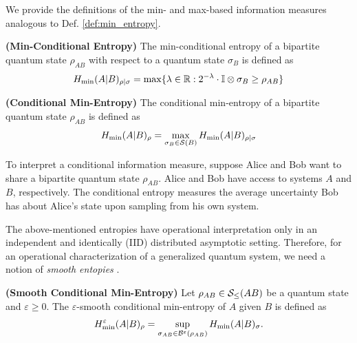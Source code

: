 
We provide the definitions of the min- and max-based information measures analogous to Def. \ref{def:min_entropy}. 


\begin{definition}
\textbf{(Min-Conditional Entropy)} The min-conditional entropy of a bipartite quantum state $\rho_{AB}$ with respect to a quantum state $\sigma_B$ is defined as 
\[H_{\min}(A|B)_{\rho|\sigma} = \max\{\lambda \in \mathbb{R} : 2^{-\lambda}\cdot \mathbb{I} \otimes \sigma_B \geq \rho_{AB}\}\]
\end{definition}

\begin{definition}
\textbf{(Conditional Min-Entropy) }The conditional min-entropy of a bipartite quantum state $\rho_{AB}$ is defined as 
\[H_{\min}(A|B)_{\rho} = \max_{\sigma_B \in \mathcal{S}(B)} H_{\min}(A|B)_{\rho|\sigma}\]
\end{definition}

To interpret a conditional information measure, suppose Alice and Bob want to share a bipartite quantum state $\rho _{AB}$. Alice and Bob have access to systems $A$ and $B$, respectively. The conditional entropy measures the average uncertainty Bob has about Alice's state upon sampling from his own system.
 
The above-mentioned entropies have operational interpretation only in an independent and identically (IID) distributed asymptotic setting. Therefore, for an operational characterization of a generalized quantum system, we need a notion of \textit{smooth entopies} \cite{tomamichel2012framework}. 

 
\begin{definition}\textbf{(Smooth Conditional Min-Entropy)} Let $\rho_{AB} \in \mathcal{S}_{\leq}(AB)$ be a quantum state and $\varepsilon \geq 0$. The $\varepsilon$-smooth conditional min-entropy of $A$ given $B$ is defined as
\[H_{\min}^{\varepsilon}(A|B)_\rho = \sup_{\sigma_{AB} \in \mathcal{B}^{\varepsilon}(\rho_{AB})} H_{\min}(A|B)_{\sigma}.\]
\end{definition}

